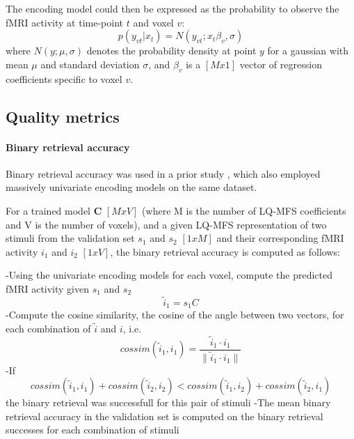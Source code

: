 The encoding model could then be expressed as the probability to observe the f{MRI} activity at time-point $t$ and voxel $v$:
\begin{equation}\label{eq:encmo}
p(y_{vt}|x_{t}) = N(y_{vt};x_{t}\beta_{v},\sigma) 
\end{equation}
where $N(y;\mu,\sigma)$ denotes the probability density at point $y$ for a gaussian with mean $\mu$ and standard deviation $\sigma$, and $\beta_{v}$ is a $[Mx1]$ vector of regression coefficients specific to voxel $v$.


\subsection*{Quality metrics}


\paragraph{Binary retrieval accuracy}

Binary retrieval accuracy \cite{ML08} was used in a prior study \cite{CTK+2012}, which also employed massively univariate encoding models on the same dataset.

For a trained model $\mathbf{C}$ $[M x V]$ (where M is the number of LQ-MFS coefficients and V is the number of voxels), and a given LQ-MFS representation of two stimuli from the validation set $s_{1}$ and $s_{2}$ $[1 x M]$ and their corresponding f{MRI} activity $i_{1}$ and $i_{2}$ $[ 1 x V ]$, the binary retrieval accuracy is computed as follows:

-Using the univariate encoding models for each voxel, compute the predicted f{MRI} activity given $s_{1}$ and $s_{2}$ 
\begin{equation}\label{eq:predict}
\widetilde{i}_{1} = s_{1}C
\end{equation}
-Compute the cosine similarity, the cosine of the angle between two vectors, for each combination of $\widetilde{i}$ and $i$, i.e.
\[ cossim(\widetilde{i}_{1},i_{1}) =  \frac{\widetilde{i}_{1} \cdot i_{1}}{\|\widetilde{i}_{1} \cdot i_{1}\|} \] 
-If \[ cossim(\widetilde{i}_{1},i_{1})+cossim(\widetilde{i}_{2},i_{2}) < cossim(\widetilde{i}_{1},i_{2})+cossim(\widetilde{i}_{2},i_{1}) \] the binary retrieval was successfull for this pair of stimuli
-The mean binary retrieval accuracy in the validation set is computed on the binary retrieval successes for each combination of stimuli

